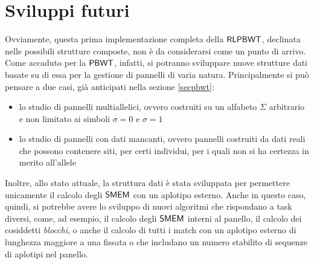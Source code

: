 \section{Sviluppi futuri}
Ovviamente, questa prima implementazione completa della $\mbox{\rm {\sf RLPBWT}}$,
declinata nelle possibili strutture composte, non è da
considerarsi come un punto di arrivo. Come accaduto per la $\mbox{\rm {\sf PBWT}}$,
infatti, si potranno sviluppare nuove strutture dati basate su di essa per la
gestione di pannelli di varia natura. Principalmente si può pensare a due casi,
già anticipati nella sezione \ref{secpbwt}:
\begin{itemize}
  \item lo studio di pannelli multiallelici, ovvero costruiti su un alfabeto
  $\Sigma$ arbitrario e non limitato ai simboli $\sigma=0$ e $\sigma=1$
  \item lo studio di pannelli con dati mancanti, ovvero pannelli costruiti
  da dati reali che possono contenere siti, per certi
  individui, per i quali non si ha certezza in merito all'allele
\end{itemize}
Inoltre, allo stato attuale, la struttura dati è stata sviluppata per permettere
unicamente il calcolo degli $\mbox{\rm {\sf SMEM}}$ con un aplotipo esterno. Anche in
questo caso, quindi, si potrebbe avere lo sviluppo di nuovi algoritmi che
rispondano a task diversi, come, ad esempio, il calcolo degli $\mbox{\rm {\sf SMEM}}$ interni al
panello, il 
calcolo dei cosiddetti \textit{blocchi}, o anche il calcolo di tutti i match con
un aplotipo 
esterno di lunghezza maggiore a una fissata o che includano un numero stabilito
di sequenze di aplotipi nel panello.
